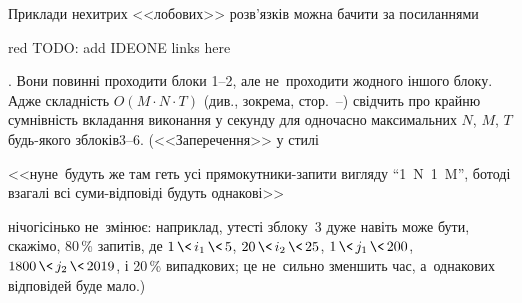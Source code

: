  Приклади нехитрих <<лобових>> розв'язків можна бачити за посиланнями 
\begin{Huge}
\begin{color}{red}
TODO: add IDEONE links here
\end{color}
\end{Huge}.
Вони повинні проходити блоки \mbox{1--2}, але не~проходити жодного іншого блоку. Адже складність $O(M{\cdot}N{\cdot}T)$ (див., зокрема, стор.~\pageref{text:asymptotic-defs-begin}--\pageref{text:asymptotic-defs-end}) свідчить про крайню сумнівність вкладання виконання у секунду для одночасно максимальних $N$, $M$, $T$ будь-якого з\nolinebreak[2] блоків\nolinebreak[3] \mbox{3--6}. (<<Заперечення>> у стилі \begin{slshape}<<ну\nolinebreak[2] не~будуть же там геть усі прямокутники-запити вигляду ``1~N~1~M'', бо\nolinebreak[2] тоді взагалі всі суми-відповіді будуть однакові>>\end{slshape} нічогісінько не~змінює: наприклад, у\nolinebreak[3] тесті з\nolinebreak[3] блоку~3 дуже навіть може бути, скажімо, 80$\,$\% запитів, де
$1\,{\<}\,i_1\,{\<}\,5$,\hspace{0pt plus 0.5em}
$20\,{\<}\,i_2\,{\<}\,25$,\hspace{0pt plus 0.5em}
$1\,{\<}\,j_1\,{\<}\,200$,\hspace{0pt plus 0.5em}
$1800\,{\<}\,j_2\,{\<}\,2019$,\hspace{0pt plus 0.5em}
і 20$\,$\% %
випадкових;
це не~сильно зменшить час, а~однакових відповідей буде мало.)

